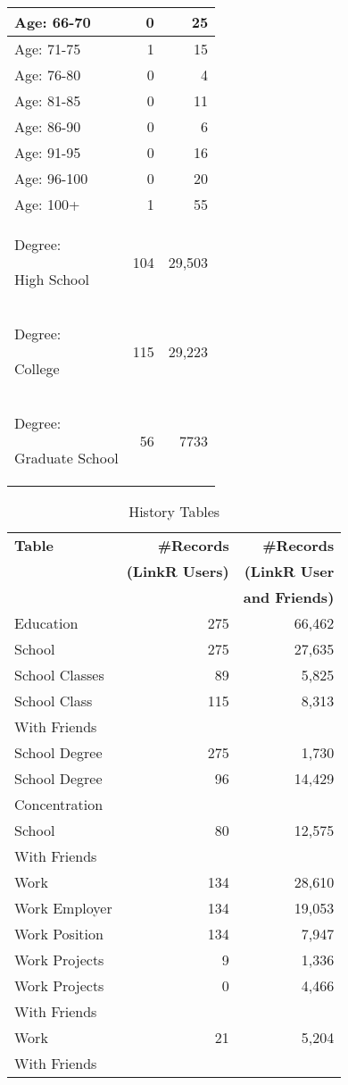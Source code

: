 \begin{table}[p]
\begin{tabular}{|>{\small}p{2cm}|>{\small}r|>{\small}r|}
\hline
Age: 66-70 & 0 & 25 \\
\hline
Age: 71-75 & 1 & 15 \\
\hline
Age: 76-80 & 0 & 4 \\
\hline
Age: 81-85 & 0 & 11 \\
\hline
Age: 86-90 & 0 & 6 \\
\hline
Age: 91-95 & 0 & 16 \\
\hline
Age: 96-100 & 0 & 20 \\
\hline
Age: 100+ & 1 & 55 \\
\hline
Degree:\par High School & 104 & 29,503 \\
\hline
Degree:\par College & 115 & 29,223 \\
\hline
Degree:\par Graduate School & 56 & 7733 \\
\hline
\end{tabular}
\end{table}




\begin{table}[p]
\centering
\caption{\small History Tables}
\label{tab:history}
\begin{tabular}{|>{\small}p{2cm}|>{\small}r|>{\small}r|}
\hline
\textbf{Table} & \textbf{\#Records} & \textbf{\#Records} \\
& \textbf{(LinkR Users)} & \textbf{(LinkR User} \\
& & \textbf{and Friends)} \\
\hline
Education & 275 & 66,462 \\
\hline
School & 275 & 27,635 \\
\hline
School Classes & 89 & 5,825 \\
\hline
School Class & 115 & 8,313 \\
With Friends & & \\
\hline
School Degree & 275 & 1,730 \\
\hline
School Degree & 96 & 14,429 \\
Concentration & & \\
\hline
School & 80 & 12,575 \\
With Friends & & \\
\hline
Work & 134 & 28,610 \\
\hline
Work Employer & 134 & 19,053 \\
\hline
Work Position & 134 & 7,947 \\
\hline
Work Projects & 9 & 1,336 \\
\hline
Work Projects & 0 & 4,466 \\
With Friends & & \\
\hline
Work & 21 & 5,204 \\
With Friends & & \\
\hline
\end{tabular}
\end{table}






